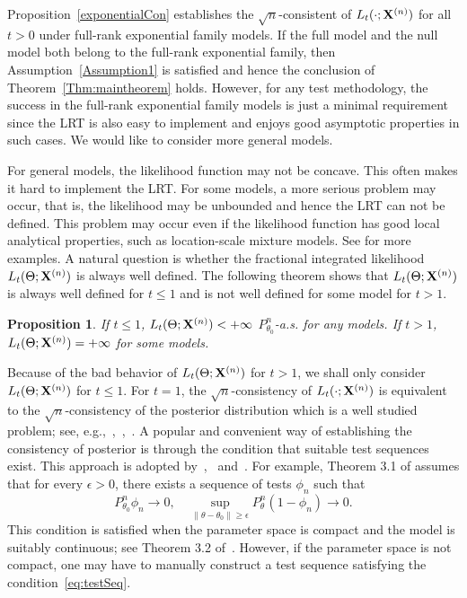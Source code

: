 \documentclass[11pt]{article}
\theoremstyle{plain}
\newtheorem{proposition}{\quad\quad Proposition}
\theoremstyle{definition}
\theoremstyle{remark}
\begin{document}
Proposition~\ref{exponentialCon} establishes the $\sqrt{n}$-consistent of $L_t(\cdot;\mathbf{X}^{(n)})$ for all $t>0$ under full-rank exponential family models.
If the full model and the null model both belong to the full-rank exponential family, then Assumption~\ref{Assumption1} is satisfied and 
hence the conclusion of Theorem~\ref{Thm:maintheorem} holds.
However,
for any test methodology, the success in the full-rank exponential family models is just a minimal requirement 
since the LRT is also easy to implement and enjoys good asymptotic properties in such cases.
We would like to consider more general models.


For general models, the likelihood function may not be concave.
This often makes it hard to implement the LRT.
For some models, a more serious problem may occur, that is, the likelihood may be unbounded and hence the LRT can not be defined.
This problem may occur even if the likelihood function has good local analytical properties, such as location-scale mixture models.  See \cite{Cam1990Maximum} for more examples.
A natural question is whether the fractional integrated likelihood $L_t(\Theta;\mathbf{X}^{(n)})$ is always well defined.
The following theorem shows that $L_t(\Theta;\mathbf{X}^{(n)})$ is always well defined for $t\leq 1$ and is not well defined for some model for $t>1$.
\begin{proposition}
    If $t\leq 1$, $L_t(\Theta;\mathbf{X}^{(n)})< +\infty$ $P_{\theta_0}^n$-a.s. for any models. If $t> 1$, $L_t(\Theta;\mathbf{X}^{(n)}) = +\infty$ for some models.
    \label{exprop}
\end{proposition}



Because of the bad behavior of $L_t(\Theta;\mathbf{X}^{(n)})$ for $t>1$, we shall only consider $L_t(\Theta;\mathbf{X}^{(n)})$ for $t\leq 1$.
For $t=1$, the $\sqrt{n}$-consistency of $L_t(\cdot;\mathbf{X}^{(n)})$ is equivalent to the $\sqrt{n}$-consistency of the posterior distribution which is a well studied problem; see, e.g.,~\cite{ghosal2000},~\cite{Shen2001Rates},~\cite{vaart2007convergence}.
A popular and convenient way of establishing the consistency of posterior is through the condition that suitable test sequences exist.
This approach is adopted by~\cite{ghosal2000},~\cite{vaart2007convergence} and~\cite{Kleijn2012The}.
For example, Theorem 3.1 of \cite{Kleijn2012The} assumes that for every $\epsilon>0$, there exists a sequence of tests $\phi_n$ such that
\begin{equation}\label{eq:testSeq}
    P_{\theta_0}^n\phi_n\to 0,\quad \sup_{\|\theta-\theta_0\|\geq \epsilon} P_\theta^n(1-\phi_n)\to 0.
\end{equation}
This condition is satisfied when the parameter space is compact and the model is suitably continuous; see Theorem 3.2 of~\cite{Kleijn2012The}.
However, if the parameter space is not compact, one may have to manually construct a test sequence satisfying the condition~\eqref{eq:testSeq}.
\end{document}
